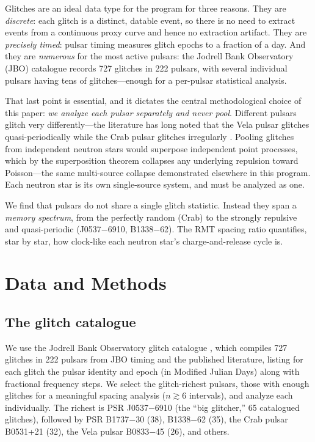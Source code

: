 \documentclass[12pt,a4paper]{article}
\begin{document}
Glitches are an ideal data type for the program for three reasons. They are \emph{discrete}: each glitch is a distinct, datable event, so there is no need to extract events from a continuous proxy curve and hence no extraction artifact. They are \emph{precisely timed}: pulsar timing measures glitch epochs to a fraction of a day. And they are \emph{numerous} for the most active pulsars: the Jodrell Bank Observatory (JBO) catalogue \citep{espinoza2011,basu2022} records 727 glitches in 222 pulsars, with several individual pulsars having tens of glitches---enough for a per-pulsar statistical analysis.

That last point is essential, and it dictates the central methodological choice of this paper: \emph{we analyze each pulsar separately and never pool}. Different pulsars glitch very differently---the literature has long noted that the Vela pulsar glitches quasi-periodically while the Crab pulsar glitches irregularly \citep{espinoza2011,basu2022}. Pooling glitches from independent neutron stars would superpose independent point processes, which by the superposition theorem collapses any underlying repulsion toward Poisson---the same multi-source collapse demonstrated elsewhere in this program. Each neutron star is its own single-source system, and must be analyzed as one.

We find that pulsars do not share a single glitch statistic. Instead they span a \emph{memory spectrum}, from the perfectly random (Crab) to the strongly repulsive and quasi-periodic (J0537$-$6910, B1338$-$62). The RMT spacing ratio quantifies, star by star, how clock-like each neutron star's charge-and-release cycle is.

\section{Data and Methods}

\subsection{The glitch catalogue}

We use the Jodrell Bank Observatory glitch catalogue \citep{basu2022}, which compiles 727 glitches in 222 pulsars from JBO timing and the published literature, listing for each glitch the pulsar identity and epoch (in Modified Julian Days) along with fractional frequency steps. We select the glitch-richest pulsars, those with enough glitches for a meaningful spacing analysis ($n\gtrsim6$ intervals), and analyze each individually. The richest is PSR J0537$-$6910 (the ``big glitcher,'' 65 catalogued glitches), followed by PSR B1737$-$30 (38), B1338$-$62 (35), the Crab pulsar B0531+21 (32), the Vela pulsar B0833$-$45 (26), and others.
\end{document}
